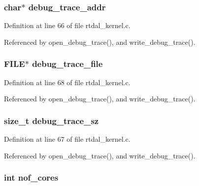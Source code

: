 \subsubsection[{debug\-\_\-trace\-\_\-addr}]{\setlength{\rightskip}{0pt plus 5cm}char$\ast$ debug\-\_\-trace\-\_\-addr}\label{rtdal__kernel_8c_a8fe8a97db2250e73d61441632f950f5f}


Definition at line 66 of file rtdal\-\_\-kernel.\-c.



Referenced by open\-\_\-debug\-\_\-trace(), and write\-\_\-debug\-\_\-trace().

\subsubsection[{debug\-\_\-trace\-\_\-file}]{\setlength{\rightskip}{0pt plus 5cm}F\-I\-L\-E$\ast$ debug\-\_\-trace\-\_\-file}\label{rtdal__kernel_8c_a86a8d012600cf066725345344d40a5da}


Definition at line 68 of file rtdal\-\_\-kernel.\-c.



Referenced by open\-\_\-debug\-\_\-trace(), and write\-\_\-debug\-\_\-trace().

\subsubsection[{debug\-\_\-trace\-\_\-sz}]{\setlength{\rightskip}{0pt plus 5cm}size\-\_\-t debug\-\_\-trace\-\_\-sz}\label{rtdal__kernel_8c_ab79c13782617d982dae3fdc114ac39d6}


Definition at line 67 of file rtdal\-\_\-kernel.\-c.



Referenced by open\-\_\-debug\-\_\-trace(), and write\-\_\-debug\-\_\-trace().

\subsubsection[{nof\-\_\-cores}]{\setlength{\rightskip}{0pt plus 5cm}int nof\-\_\-cores}\label{rtdal__kernel_8c_a963897f83bd39432e5c50dee715eb2f9}



